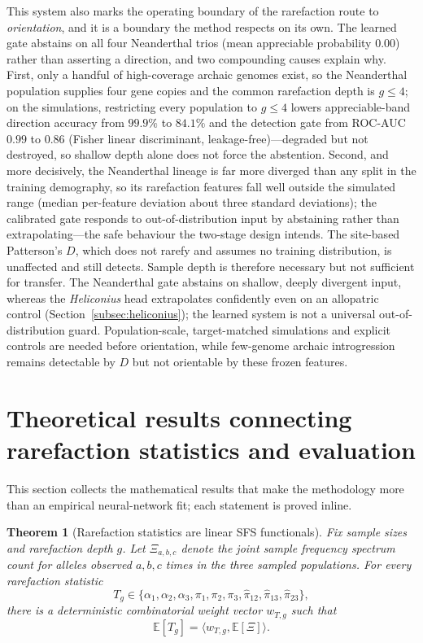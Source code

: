 \documentclass[11pt]{article}
\theoremstyle{plain}
\newtheorem{thm}{Theorem}[section]
\theoremstyle{definition}
\theoremstyle{remark}
\begin{document}
This system also marks the operating boundary of the rarefaction route to \emph{orientation}, and it
is a boundary the method respects on its own. The learned gate abstains on all four Neanderthal trios
(mean appreciable probability $0.00$) rather than asserting a direction, and two compounding causes
explain why. First, only a handful of high-coverage archaic genomes exist, so the Neanderthal
population supplies four gene copies and the common rarefaction depth is $g\le 4$; on the simulations,
restricting every population to $g\le 4$ lowers appreciable-band direction accuracy from $99.9\%$ to
$84.1\%$ and the detection gate from ROC-AUC $0.99$ to $0.86$ (Fisher linear discriminant,
leakage-free)---degraded but not destroyed, so shallow depth alone does not force the abstention.
Second, and more decisively, the Neanderthal lineage is far more diverged than any split in the
training demography, so its rarefaction features fall well outside the simulated range (median
per-feature deviation about three standard deviations); the calibrated gate responds to
out-of-distribution input by abstaining rather than extrapolating---the safe behaviour the two-stage
design intends. The site-based Patterson's $D$, which does not rarefy and assumes no training
distribution, is unaffected and still detects. Sample depth is therefore necessary but not sufficient
for transfer. The Neanderthal gate abstains on shallow, deeply divergent input, whereas the
\textit{Heliconius} head extrapolates confidently even on an allopatric control
(Section~\ref{subsec:heliconius}); the learned system is not a universal out-of-distribution guard.
Population-scale, target-matched simulations and explicit controls are needed before orientation,
while few-genome archaic introgression remains detectable by $D$ but not orientable by these frozen
features.

\section{Theoretical results connecting rarefaction statistics and evaluation}
\label{sec:theoretical-results}

This section collects the mathematical results that make the methodology more than an
empirical neural-network fit; each statement is proved inline.

\begin{thm}[Rarefaction statistics are linear SFS functionals]\label{thm:linear-sfs}
Fix sample sizes and rarefaction depth \(g\). Let \(\Xi_{a,b,c}\) denote the joint sample
frequency spectrum count for alleles observed \(a,b,c\) times in the three sampled
populations. For every rarefaction statistic
\[
T_g\in\{\alpha_1,\alpha_2,\alpha_3,\pi_1,\pi_2,\pi_3,
\widehat{\pi}_{12},\widehat{\pi}_{13},\widehat{\pi}_{23}\},
\]
there is a deterministic combinatorial weight vector \(w_{T,g}\) such that
\[
\mathbb{E}[T_g]=\langle w_{T,g},\mathbb{E}[\Xi]\rangle .
\]
\end{thm}
\end{document}
